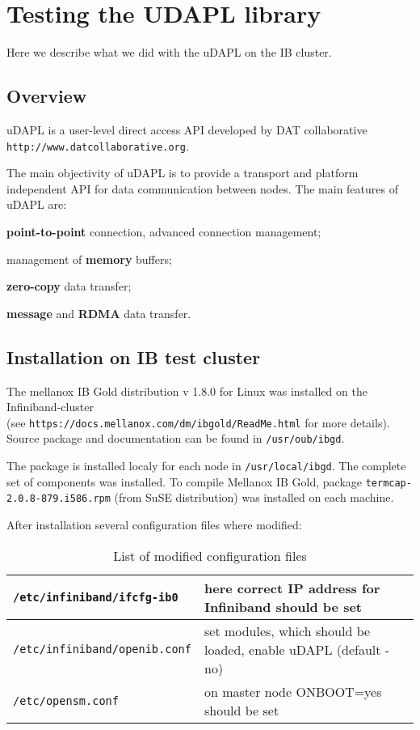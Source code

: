 
\clearpage
\section{Testing the UDAPL library}
Here we describe what we did with the uDAPL on the IB cluster.

\subsection{Overview}

uDAPL is a user-level direct access API
developed by DAT collaborative {\tt http://www.datcollaborative.org}.

The main objectivity of uDAPL is to provide a transport and platform independent 
API for data communication between nodes.
The main features of uDAPL are:
\begin{compactitem}[$\bullet$]
 \item {\bf point-to-point} connection, advanced connection management; 
 \item management of {\bf memory} buffers;
 \item {\bf zero-copy} data transfer;
 \item {\bf message} and {\bf RDMA} data transfer. 
\end{compactitem} 


\subsection{Installation on IB test cluster}

The mellanox IB Gold distribution v 1.8.0 for Linux was installed on the Infiniband-cluster\\
(see {\tt https://docs.mellanox.com/dm/ibgold/ReadMe.html} for more details).
Source package and documentation can be found in {\tt /usr/oub/ibgd}.

The package is installed localy for each node in {\tt /usr/local/ibgd}. 
The complete set of components was installed. 
To compile Mellanox IB Gold, package {\tt termcap-2.0.8-879.i586.rpm} (from SuSE distribution) 
was installed on each machine.

After installation several configuration files where modified:

\begin{table}[htb]
\begin{center}

\caption{List of modified configuration files}

\begin{tabular}{|l|l|}\hline

 {\tt /etc/infiniband/ifcfg-ib0}   & here correct IP address for Infiniband should be set \\ \hline
 {\tt /etc/infiniband/openib.conf} & set modules, which should be loaded, enable uDAPL (default - no) \\ \hline
 {\tt /etc/opensm.conf}            & on master node ONBOOT=yes should be set \\ \hline

\end{tabular}
\end{center}
\end{table}

